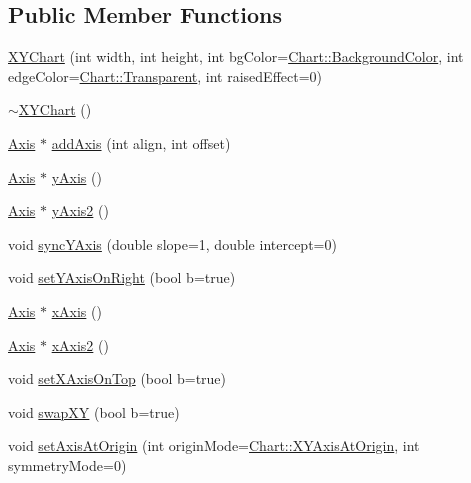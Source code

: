 \subsection*{Public Member Functions}
\begin{DoxyCompactItemize}
\item 
\hyperlink{class_x_y_chart_af88de18a1c96e62c74532ca9386b5a11}{X\+Y\+Chart} (int width, int height, int bg\+Color=\hyperlink{namespace_chart_abee0d882fdc9ad0b001245ad9fc64011a134193bde693b9d152d0c6dc59fa7d7f}{Chart\+::\+Background\+Color}, int edge\+Color=\hyperlink{namespace_chart_abee0d882fdc9ad0b001245ad9fc64011afc6811800a9e2582dac0157b6279f836}{Chart\+::\+Transparent}, int raised\+Effect=0)
\item 
\hyperlink{class_x_y_chart_ac0dbfde985dbdd51637c1bf22a2c0ce9}{$\sim$\+X\+Y\+Chart} ()
\item 
\hyperlink{class_axis}{Axis} $\ast$ \hyperlink{class_x_y_chart_a90c3eb8c1597a2f50e63e84555d51a22}{add\+Axis} (int align, int offset)
\item 
\hyperlink{class_axis}{Axis} $\ast$ \hyperlink{class_x_y_chart_a22adca1189b6caa260d71fe4122033ab}{y\+Axis} ()
\item 
\hyperlink{class_axis}{Axis} $\ast$ \hyperlink{class_x_y_chart_aaddf44015a8d6eb406c548ea4b644d5c}{y\+Axis2} ()
\item 
void \hyperlink{class_x_y_chart_a0d45ea4e19b8b60d93ca36b1f4f8f3fd}{sync\+Y\+Axis} (double slope=1, double intercept=0)
\item 
void \hyperlink{class_x_y_chart_ad21b25e04ddc8979e85967c5f6659610}{set\+Y\+Axis\+On\+Right} (bool b=true)
\item 
\hyperlink{class_axis}{Axis} $\ast$ \hyperlink{class_x_y_chart_a4ae44126c336029899db3b70ee92b5f8}{x\+Axis} ()
\item 
\hyperlink{class_axis}{Axis} $\ast$ \hyperlink{class_x_y_chart_a9883db03a403936680d0c57bdd16eb94}{x\+Axis2} ()
\item 
void \hyperlink{class_x_y_chart_a7cca8475736683fec321ed407b93771b}{set\+X\+Axis\+On\+Top} (bool b=true)
\item 
void \hyperlink{class_x_y_chart_a91e9233dd2a3a76c44a87e7ecc0ade2f}{swap\+XY} (bool b=true)
\item 
void \hyperlink{class_x_y_chart_af108637af88e17464fbd2e675c03964f}{set\+Axis\+At\+Origin} (int origin\+Mode=\hyperlink{namespace_chart_a4c12835958ae0919e9c54011055fa7b4a39ca2a3eabb9c560fdc20cbb2559bdc8}{Chart\+::\+X\+Y\+Axis\+At\+Origin}, int symmetry\+Mode=0)
\item 

\end{DoxyCompactItemize}

